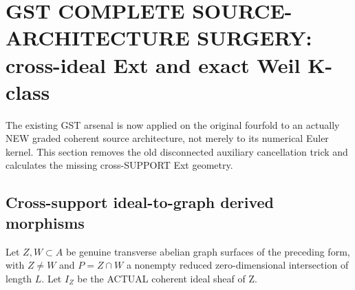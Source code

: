 \documentclass[11pt,a4paper]{article}
\begin{document}
\section{GST COMPLETE SOURCE-ARCHITECTURE SURGERY: cross-ideal Ext and exact Weil K-class}
The existing GST arsenal is
now applied on the original
fourfold to an actually NEW
graded coherent source
architecture, not merely to
its numerical Euler kernel.
This section removes the
old disconnected auxiliary
cancellation trick and
calculates the missing
cross-SUPPORT Ext geometry.

\subsection*{Cross-support ideal-to-graph derived morphisms}
Let \(Z,W\subset A\)
be genuine transverse
abelian graph surfaces
of the preceding form,
with \(Z\ne W\) and
\(P=Z\cap W\) a nonempty
reduced zero-dimensional
intersection of length \(L\).
Let \(I_Z\) be the ACTUAL
coherent ideal sheaf of Z.
\end{document}
